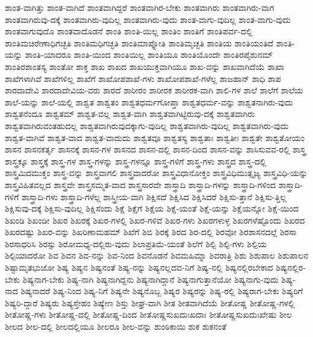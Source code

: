 {ಶಾಂತ-ವಾಗಿತ್ತು
ಶಾಂತ-ವಾಗಿದೆ
ಶಾಂತವಾಗಿದ್ದರೆ
ಶಾಂತವಾಗಿರ-ಬೇಕು
ಶಾಂತವಾಗಿರು
ಶಾಂತವಾಗಿರು-ವಾಗ
ಶಾಂತವಾಗಿರುವು-ದಕ್ಕೆ
ಶಾಂತವಾಗಿರು-ವುದಿಲ್ಲ
ಶಾಂತವಾಗಿರು-ವುದು
ಶಾಂತ-ವಾಗು-ವುದಿಲ್ಲ
ಶಾಂತ-ವಾಗು-ವುದು
ಶಾಂತವಾಗುವುದೊ
ಶಾಂತವಾದೊಡನೆ
ಶಾಂತಿ
ಶಾಂತಿ-ಯಿಲ್ಲ
ಶಾಂತಿಂ
ಶಾಂತಿಗೆ
ಶಾಂತಿಪರ್ವ-ದಲ್ಲಿ
ಶಾಂತಿಮಚಿರೇಣಾಧಿಗಚ್ಛತಿ
ಶಾಂತಿಮಧಿಗಚ್ಛತಿ
ಶಾಂತಿಮಾಪ್ನೋತಿ
ಶಾಂತಿಮೃಚ್ಛತಿ
ಶಾಂತಿಯ
ಶಾಂತಿಯಂತಿದೆ
ಶಾಂತಿ-ಯನ್ನು
ಶಾಂತಿ-ಯಾದರೂ
ಶಾಂತಿ-ಯಿಂದ
ಶಾಂತಿಯಿಲ್ಲ
ಶಾಂತಿಯೂ
ಶಾಂತಿಯೊಂದೇ
ಶಾಂತಿರಪೈಶುನಮ್
ಶಾಂತಿರಶಾಂತಸ್ಯ
ಶಾಂತೋ
ಶಾಕ್ತ
ಶಾಖ
ಶಾಖದ
ಶಾಖಯುಕ್ತವಾಗಿಯೂ
ಶಾಖ-ವನ್ನು
ಶಾಖವಾಗಿದೆಯೆ
ಶಾಖಾ
ಶಾಖೆಗಳಾಗಿವೆ
ಶಾಖೆಗಳಿಲ್ಲ
ಶಾಖೆಗೆ
ಶಾಖೋಪಶಾಖೆ-ಗಳು
ಶಾಖೋಪಶಾಖೆ-ಗಳೆಲ್ಲ
ಶಾಜಹಾನ್
ಶಾಧಿ
ಶಾಪ
ಶಾರದಾದೇವಿ
ಶಾರದಾದೇವಿಯ-ವರು
ಶಾರದೆ
ಶಾರೀರಂ
ಶಾರೀರಕ
ಶಾರೀರಕ-ವಾಗಿ
ಶಾಲಿ-ಗಳ
ಶಾಲೆ
ಶಾಲೆಗೆ
ಶಾಲೆಯ
ಶಾಲೆ-ಯನ್ನು
ಶಾಲೆ-ಯಲ್ಲಿ
ಶಾಶ್ವತ
ಶಾಶ್ವತಂ
ಶಾಶ್ವತಧರ್ಮಗೋಪ್ತಾ
ಶಾಶ್ವತಧರ್ಮ-ವನ್ನು
ಶಾಶ್ವತನಾಗಿರು-ವುದು
ಶಾಶ್ವತನೆಂದೂ
ಶಾಶ್ವತಮ್
ಶಾಶ್ವತ-ವಲ್ಲ
ಶಾಶ್ವತ-ವಾಗಿ
ಶಾಶ್ವತವಾಗಿಟ್ಟಿರುವು-ದಕ್ಕೆ
ಶಾಶ್ವತವಾಗಿರು
ಶಾಶ್ವತವಾಗಿರುವಂತಹುದಲ್ಲ
ಶಾಶ್ವತವಾಗಿರುವುದಕ್ಕಾಗು-ವುದಿಲ್ಲ
ಶಾಶ್ವತವಾಗಿರು-ವುದಿಲ್ಲ
ಶಾಶ್ವತವಾಗಿರು-ವುದು
ಶಾಶ್ವತ-ವಾಗಿವೆ
ಶಾಶ್ವತ-ವಾದ
ಶಾಶ್ವತ-ವಾದುದು
ಶಾಶ್ವತವೂ
ಶಾಶ್ವತಸ್ಯ
ಶಾಶ್ವತಾಃ
ಶಾಶ್ವತೀಃ
ಶಾಶ್ವತೇ
ಶಾಶ್ವತೋಯಂ
ಶಾಸನ
ಶಾಸನಕರ್ತೃ
ಶಾಸನಕ್ಕೆ
ಶಾಸನ-ಗಳ
ಶಾಸನದ
ಶಾಸನ-ದಲ್ಲಿ
ಶಾಸನ-ದಿಂದ
ಶಾಸನ-ವನ್ನು
ಶಾಸಿಸುವವ-ರಲ್ಲಿ
ಶಾಸ್ತ್ರ
ಶಾಸ್ತ್ರಕ್ಕೂ
ಶಾಸ್ತ್ರಕ್ಕೆ
ಶಾಸ್ತ್ರ-ಗಳ
ಶಾಸ್ತ್ರ-ಗಳನ್ನು
ಶಾಸ್ತ್ರ-ಗಳನ್ನೂ
ಶಾಸ್ತ್ರ-ಗಳಿಗೆ
ಶಾಸ್ತ್ರ-ಗಳು
ಶಾಸ್ತ್ರದ
ಶಾಸ್ತ್ರ-ದಲ್ಲಿ
ಶಾಸ್ತ್ರಮಿದಮುಕ್ತಂ
ಶಾಸ್ತ್ರ-ವನ್ನು
ಶಾಸ್ತ್ರವಾಗಲಿ
ಶಾಸ್ತ್ರವಾದರೋ
ಶಾಸ್ತ್ರವಿಧಾನೋಕ್ತಂ
ಶಾಸ್ತ್ರವಿಧಿಮುತ್ಸೃಜ್ಯ
ಶಾಸ್ತ್ರವಿಧಿ-ಯನ್ನು
ಶಾಸ್ತ್ರವಿಹಿತವಲ್ಲದ
ಶಾಸ್ತ್ರವೇ
ಶಾಸ್ತ್ರಸಮ್ಮತ-ವಾದ
ಶಾಸ್ತ್ರಸಾರವೇ
ಶಾಸ್ತ್ರಾದಿ
ಶಾಸ್ತ್ರಾದಿ-ಗಳನ್ನು
ಶಾಸ್ತ್ರಾದಿ-ಗಳಿಂದ
ಶಾಸ್ತ್ರಾದಿ-ಗಳಿಗೆ
ಶಾಸ್ತ್ರಾದಿ-ಗಳು
ಶಾಸ್ತ್ರಾದಿ-ಗಳೆಲ್ಲ
ಶಾಸ್ತ್ರೀಯ-ವಾಗಿ
ಶಿಕ್ಷಿಸದೆ
ಶಿಕ್ಷಿಸಿದ
ಶಿಕ್ಷಿಸಿದರೆ
ಶಿಕ್ಷಿಸು-ತ್ತಾನೆ
ಶಿಕ್ಷಿಸು-ತ್ತಿಲ್ಲ
ಶಿಕ್ಷಿಸುವು-ದಕ್ಕೆ
ಶಿಕ್ಷಿಸು-ವುದಿಲ್ಲ
ಶಿಕ್ಷಿಸೆಂದು
ಶಿಕ್ಷೆ
ಶಿಕ್ಷೆಗೆ
ಶಿಕ್ಷೆಯ
ಶಿಕ್ಷೆ-ಯಂತೆ
ಶಿಕ್ಷೆ-ಯನ್ನು
ಶಿಕ್ಷೆಯನ್ನೋ
ಶಿಕ್ಷೆ-ಯಿಂದ
ಶಿಖಂಡಿ
ಶಿಖಂಡೀ
ಶಿಖರ
ಶಿಖರಕ್ಕೆ
ಶಿಖರ-ಗಳಲ್ಲಿ
ಶಿಖರ-ಗಳಿವೆ
ಶಿಖರ-ಗಳು
ಶಿಖರಗಳುಳ್ಳ
ಶಿಖರಗಳೆಷ್ಟೊಂದು
ಶಿಖರದ
ಶಿಖರದಷ್ಟು
ಶಿಖರ-ವನ್ನು
ಶಿಖರಿಣಾಮಹಮ್
ಶಿಖೆಗೆ
ಶಿಬಿ
ಶಿರಕ್ಕೆ
ಶಿರದ
ಶಿರ-ದಲ್ಲಿ
ಶಿರವೋ
ಶಿರಶಾಸನದಲ್ಲೆ
ಶಿರಸಾ
ಶಿರಸಾಧರಿಸಿ
ಶಿರಸ್ಸು
ಶಿರೋಮಧ್ಯ-ದಲ್ಲಿರು-ವುದು
ಶಿಲಾಪ್ರತಿಮೆ-ಯಂತೆ
ಶಿಲೆಗೆ
ಶಿಲ್ಪಿ
ಶಿಲ್ಪಿ-ಗಳು
ಶಿಲ್ಪಿಯ
ಶಿಲ್ಪಿಯಾದರೋ
ಶಿವ
ಶಿವನ
ಶಿವ-ನನ್ನು
ಶಿವ-ನಿಂದ
ಶಿವನೊಡನೆ
ಶಿವಮಹಿಮ್ನಾ
ಶಿವರಾತ್ರಿ
ಶಿಶು
ಶಿಶುಪಾಲ
ಶಿಶುಪಾಲನ
ಶಿಷ್ಟಾಮೃತಭುಜೋ
ಶಿಷ್ಯ
ಶಿಷ್ಯನ
ಶಿಷ್ಯನಂತೆ
ಶಿಷ್ಯ-ನನ್ನು
ಶಿಷ್ಯನಲ್ಲದವ-ನಿಗೆ
ಶಿಷ್ಯ-ನಲ್ಲಿ
ಶಿಷ್ಯನಲ್ಲಿರಬೇಕಾದ
ಶಿಷ್ಯನಲ್ಲಿರ-ಬೇಕು
ಶಿಷ್ಯನಾಗ-ಬೇಕು
ಶಿಷ್ಯ-ನಾಗಿ
ಶಿಷ್ಯನಾಗಿದ್ದನು
ಶಿಷ್ಯನಾಗಿದ್ದಾನೆ
ಶಿಷ್ಯನಾಗುತ್ತಾನೆಯೋ
ಶಿಷ್ಯನಾಗು-ವುದು
ಶಿಷ್ಯ-ನಾದ
ಶಿಷ್ಯನಾದರೆ
ಶಿಷ್ಯ-ನಿಂದ
ಶಿಷ್ಯ-ನಿಗೆ
ಶಿಷ್ಯನೇ
ಶಿಷ್ಯನೊಬ್ಬ
ಶಿಷ್ಯರ
ಶಿಷ್ಯರನ್ನು
ಶಿಷ್ಯ-ರಲ್ಲಿ
ಶಿಷ್ಯರಾಗ-ಬೇಕು
ಶಿಷ್ಯರಿಗೆ
ಶಿಷ್ಯರಿ-ದ್ದಾರೆ
ಶಿಷ್ಯರು
ಶಿಷ್ಯಸ್ತೇಹಂ
ಶಿಷ್ಯೇಣ
ಶಿಸ್ತು
ಶೀಘ್ರ-ವಾಗಿ
ಶೀತ
ಶೀತವಾಗಿದೆಯೆ
ಶೀತೋಷ್ಣ
ಶೀತೋಷ್ಣ-ಗಳಲ್ಲಿ
ಶೀತೋಷ್ಣ-ಗಳು
ಶೀತೋಷ್ಣ-ದಲ್ಲಿ
ಶೀತೋಷ್ಣ-ದಿಂದ
ಶೀತೋಷ್ಣಸುಖದುಃಖದಾಃ
ಶೀತೋಷ್ಣಸುಖದುಃಖೇಷು
ಶೀಲ
ಶೀಲದ
ಶೀಲ-ದಲ್ಲಿ
ಶೀಲದಲ್ಲಿಯೂ
ಶೀಲರೂ
ಶೀಲ-ವನ್ನು
ಶುಂಠಿಕಾಯಿ
ಶುಕ
ಶುಕನಂತೆ
}
